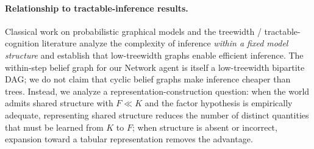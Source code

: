 \paragraph{Relationship to tractable-inference results.}
Classical work on probabilistic graphical models \cite{Pearl1988} and the
treewidth / tractable-cognition literature \cite{vanRooij2008,Kwisthout2010}
analyze the complexity of inference \emph{within a fixed model structure} and
establish that low-treewidth graphs enable efficient inference.  The within-step
belief graph for our Network agent is itself a low-treewidth bipartite DAG; we
do not claim that cyclic belief graphs make inference cheaper than trees.
Instead, we analyze a representation-construction question: when the world
admits shared structure with $F\ll K$ and the factor hypothesis is empirically
adequate, representing shared structure reduces the number of distinct
quantities that must be learned from $K$ to $F$; when structure is absent or
incorrect, expansion toward a tabular representation removes the advantage.

